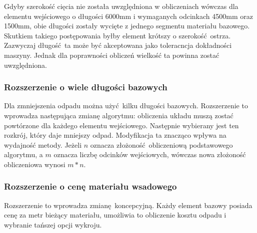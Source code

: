 Gdyby szerokość cięcia nie została uwzględniona w obliczeniach wówczas dla elementu wejściowego o długości 6000mm i wymaganych odcinkach 4500mm oraz 1500mm, obie długości zostały wycięte z jednego segmentu materiału bazowego. Skutkiem takiego postępowania byłby element krótszy o szerokość ostrza. Zazwyczaj długość ta może być akceptowana jako toleracncja dokładności maszyny. Jednak dla poprawności obliczeń wielkość ta powinna zostać uwzględniona.

\subsubsection{Rozszerzenie o wiele długości bazowych}
Dla zmniejszenia odpadu można użyć kilku długości bazowych. Rozszerzenie to wprowadza następująca zmianę algorytmu: obliczenia układu muszą zostać powtórzone dla każdego elementu wejściowego. Następnie wybierany jest ten rozkrój, który daje mniejszy odpad. Modyfikacja ta znacząco wpływa na wydajność metody. Jeżeli $n$ oznacza złożoność obliczeniową podstawowego algorytmu, a $m$ oznacza liczbę odcinków wejściowych, wówczas nowa złożoność obliczeniowa wynosi $m*n$. %

\subsubsection{Rozszerzenie o cenę materiału wsadowego}
Rozszerzenie to wprowadza zmianę koncepcyjną. Każdy element bazowy posiada cenę za metr bieżący materiału, umożliwia to obliczenie kosztu odpadu i wybranie tańszej opcji wykroju.

